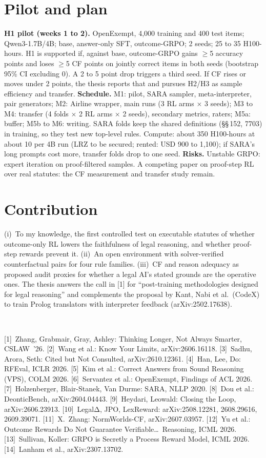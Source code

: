 \documentclass[10pt,a4paper]{article}
\newcommand{\step}[1]{\textbf{\color{tum}#1}}
\begin{document}
\section{Pilot and plan}
\step{H1 pilot (weeks 1 to 2).} OpenExempt, 4,000 training and 400 test items; Qwen3-1.7B/4B; base, answer-only SFT, outcome-GRPO; 2 seeds; 25 to 35 H100-hours. H1 is supported if, against base, outcome-GRPO gains $\geq$5 accuracy points and loses $\geq$5 CF points on jointly correct items in both seeds (bootstrap 95\% CI excluding 0). A 2 to 5 point drop triggers a third seed. If CF rises or moves under 2 points, the thesis reports that and pursues H2/H3 as sample efficiency and transfer.
\step{Schedule.} M1: pilot, SARA sampler, meta-interpreter, pair generators; M2: Airline wrapper, main runs (3 RL arms $\times$ 3 seeds); M3 to M4: transfer (4 folds $\times$ 2 RL arms $\times$ 2 seeds), secondary metrics, raters; M5a: buffer; M5b to M6: writing. SARA folds keep the shared definitions (§§\,152, 7703) in training, so they test new top-level rules. Compute: about 350 H100-hours at about 10 per 4B run (LRZ to be secured; rented: USD 900 to 1,100); if SARA's long prompts cost more, transfer folds drop to one seed.
\step{Risks.} Unstable GRPO: expert iteration on proof-filtered samples. A competing paper on proof-step RL over real statutes: the CF measurement and transfer study remain.

\section{Contribution}
(i)~To my knowledge, the first controlled test on executable statutes of whether outcome-only RL lowers the faithfulness of legal reasoning, and whether proof-step rewards prevent it. (ii)~An open environment with solver-verified counterfactual pairs for four rule families. (iii)~CF and reason adequacy as proposed audit proxies for whether a legal AI's stated grounds are the operative ones. The thesis answers the call in [1] for ``post-training methodologies designed for legal reasoning'' and complements the proposal by Kant, Nabi et al.\ (CodeX) to train Prolog translators with interpreter feedback (arXiv:2502.17638).

\vspace{0pt}{\color{accent}\rule{\linewidth}{0.3pt}}\\[-1.5pt]
{\fontsize{6.6}{7.4}\selectfont\color{muted}
[1]~Zhang, Grabmair, Gray, Ashley: Thinking Longer, Not Always Smarter, CSLAW~'26.
[2]~Wang et al.: Know Your Limits, arXiv:2606.16118.
[3]~Sadhu, Arora, Seth: Cited but Not Consulted, arXiv:2610.12361.
[4]~Han, Lee, Do: RFEval, ICLR 2026.
[5]~Kim et al.: Correct Answers from Sound Reasoning (VPS), COLM 2026.
[6]~Servantez et al.: OpenExempt, Findings of ACL 2026.
[7]~Holzenberger, Blair-Stanek, Van Durme: SARA, NLLP 2020.
[8]~Dou et al.: DeonticBench, arXiv:2604.04443.
[9]~Heydari, Leowald: Closing the Loop, arXiv:2606.23913.
[10]~LegalΔ, JPO, LexReward: arXiv:2508.12281, 2608.29616, 2609.39071.
[11]~X.\ Zhang: NormWorlds-CF, arXiv:2607.03957.
[12]~Yu et al.: Outcome Rewards Do Not Guarantee Verifiable\dots\ Reasoning, ICML 2026.
[13]~Sullivan, Koller: GRPO is Secretly a Process Reward Model, ICML 2026.
[14]~Lanham et al., arXiv:2307.13702.\par}
\end{document}
